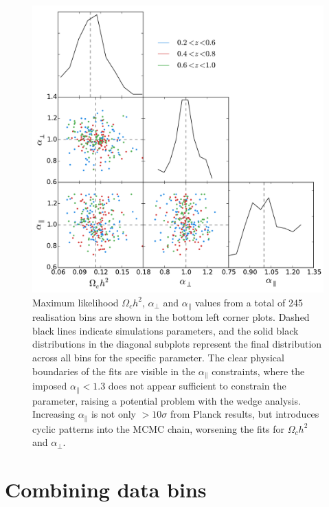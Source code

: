 \documentclass[titlesmallcaps, examinerscopy, copyrightpage]{uqthesis}
\begin{document}
\begin{figure}[h!]
  \begin{center}
    \includegraphics[width=\textwidth]{images/wdgDist2.pdf}
  \end{center}
  \caption{Maximum likelihood $\Omega_c h^2$, $\alpha_\perp$ and $\alpha_\parallel$ values from a total of 245 realisation bins are shown in the bottom left corner plots. Dashed black lines indicate simulations parameters, and the solid black distributions in the diagonal subplots represent the final distribution across all bins for the specific parameter. The clear physical boundaries of the fits are visible in the $\alpha_\parallel$ constraints, where the imposed $\alpha_\parallel < 1.3$ does not appear sufficient to constrain the parameter, raising a potential problem with the wedge analysis. Increasing $\alpha_\parallel$ is not only $>10\sigma$ from Planck results, but introduces cyclic patterns into the MCMC chain, worsening the fits for $\Omega_c h^2$ and $\alpha_\perp$.}
  \label{fig:wdgDist2}
\end{figure}





\newpage \phantom{blabla} \clearpage
\section{Combining data bins}
\end{document}

